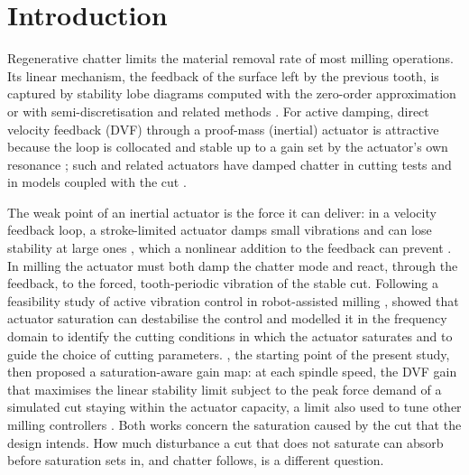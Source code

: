 \section{Introduction}\label{sec:intro}

Regenerative chatter limits the material removal rate of most milling operations. Its linear mechanism, the feedback of the surface left by the previous tooth, is captured by stability lobe diagrams computed with the zero-order approximation \citep{altintas1995analytical} or with semi-discretisation and related methods \citep{insperger2002semi,insperger2004updated,insperger2011book} \citep[reviews:][]{quintana2011chatter,munoa2016chatter,altintas2020chatter}. For active damping, direct velocity feedback (DVF) through a proof-mass (inertial) actuator is attractive because the loop is collocated and stable up to a gain set by the actuator's own resonance \citep{elliott2001feedback}; such and related actuators have damped chatter in cutting tests and in models coupled with the cut \citep{vandijk2012robust,monnin2014optimal,dohner2004mitigation,munoa2013chatter,kleinwort2021experimental,chen2007control,mancisidor2015coupled}.

The weak point of an inertial actuator is the force it can deliver: in a velocity feedback loop, a stroke-limited actuator damps small vibrations and can lose stability at large ones \citep{baumann2007destabilization}, which a nonlinear addition to the feedback can prevent \citep{dalborgo2020active}. In milling the actuator must both damp the chatter mode and react, through the feedback, to the forced, tooth-periodic vibration of the stable cut. Following a feasibility study of active vibration control in robot-assisted milling \citep{ozsoy2022robotically}, \citet{ozsoy2025frequency} showed that actuator saturation can destabilise the control and modelled it in the frequency domain to identify the cutting conditions in which the actuator saturates and to guide the choice of cutting parameters. \citet{ozsoy2026robust}, the starting point of the present study, then proposed a saturation-aware gain map: at each spindle speed, the DVF gain that maximises the linear stability limit subject to the peak force demand of a simulated cut staying within the actuator capacity, a limit also used to tune other milling controllers \citep{soufi2026robust}. Both works concern the saturation caused by the cut that the design intends. How much disturbance a cut that does not saturate can absorb before saturation sets in, and chatter follows, is a different question.

